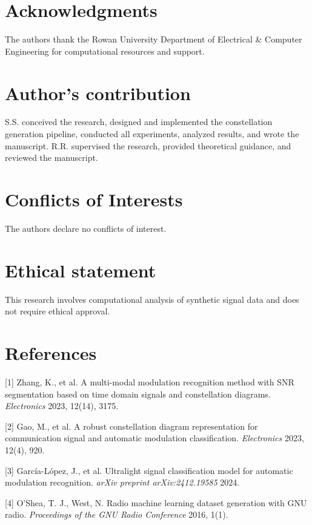 \documentclass{ELSP}
\begin{document}
{{\section*{Acknowledgments}
 
The authors thank the Rowan University Department of Electrical \& Computer Engineering for computational resources and support.

\section*{Author's contribution}

S.S. conceived the research, designed and implemented the constellation generation pipeline, conducted all experiments, analyzed results, and wrote the manuscript. R.R. supervised the research, provided theoretical guidance, and reviewed the manuscript.

\section*{Conflicts of Interests}

The authors declare no conflicts of interest.

\section*{Ethical statement}

This research involves computational analysis of synthetic signal data and does not require ethical approval.

\section*{References}

\setlength{\parindent}{0em}

[1] Zhang, K., et al. A multi-modal modulation recognition method with SNR segmentation based on time domain signals and constellation diagrams. \textit{Electronics} 2023, 12(14), 3175.

[2] Gao, M., et al. A robust constellation diagram representation for communication signal and automatic modulation classification. \textit{Electronics} 2023, 12(4), 920.

[3] García-López, J., et al. Ultralight signal classification model for automatic modulation recognition. \textit{arXiv preprint arXiv:2412.19585} 2024.

[4] O'Shea, T. J., West, N. Radio machine learning dataset generation with GNU radio. \textit{Proceedings of the GNU Radio Conference} 2016, 1(1).

}}
\end{document}

